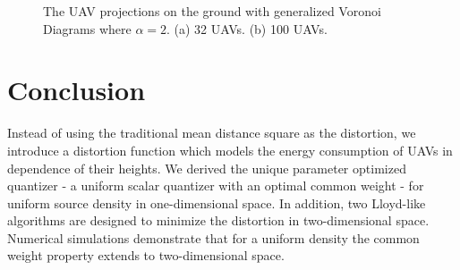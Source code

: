 \documentclass[smallabstract,smallcaptions]{dccpaper}
\begin{document}
\begin{figure}[t]
\centering
{}
\hfil
{}
\captionsetup{justification=justified}
\vspace{-2ex}
\caption{\small{The UAV projections on the ground with generalized Voronoi Diagrams where $\alpha=2$. 
(a) 32 UAVs. (b) 100 UAVs.}}
\label{Distortion_region}
\end{figure}

\section{Conclusion}
%
Instead of using the traditional mean
distance square as the distortion, we introduce a distortion function which models the energy consumption of UAVs in
dependence of their heights.  We derived the unique parameter optimized quantizer - a uniform scalar quantizer with an
optimal common weight - for uniform source density in one-dimensional space.  In addition, two Lloyd-like algorithms are
designed to minimize the distortion in two-dimensional space.  Numerical simulations demonstrate that for a uniform
density the common weight property extends to two-dimensional space.
\end{document}
